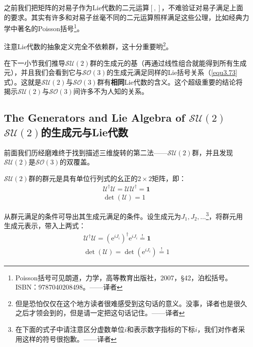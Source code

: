 之前我们把矩阵的对易子作为Lie代数的二元运算$[,]$，不难验证对易子满足上面的要求。其实有许多和对易子丝毫不同的二元运算照样满足这些公理，比如经典力学中著名的Poisson括号\footnote{Poisson括号可见朗道，力学，高等教育出版社，2007，\S42，泊松括号。ISBN：9787040208498。——译者}。

注意Lie代数的抽象定义完全不依赖群，这十分重要哟\footnote{但是恐怕仅仅在这个地方读者很难感受到这句话的意义。没事，译者也是很久之后才领会到的，但是请一定把这句话记住。——译者}。

在下一小节我们推导$\mathcal{SU}(2)$群的生成元的基（再通过线性组合就能得到所有生成元），并且我们会看到它与$\mathcal{SO}(3)$的生成元满足同样的Lie括号关系（\eqref{equ3.73}式）。这就是$\mathcal{SU}(2)$与$\mathcal{SO}(3)$群有{\bfseries 相同}Lie代数的含义。这个超级重要的结论将揭示$\mathcal{SU}(2)$与$\mathcal{SO}(3)$间许多不为人知的关系。



\subsection[$\mathcal{SU}(2)$的生成元与Lie代数]{The Generators and Lie Algebra of $\mathcal{SU}(2)$ \quad $\mathcal{SU}(2)$的生成元与Lie代数}
\label{sec3.4.3}
前面我们历经磨难终于找到描述三维旋转的第二法——$\mathcal{SU}(2)$群，并且发现$\mathcal{SU}(2)$是$\mathcal{SO}(3)$的双覆盖。

$\mathcal{SU}(2)$群的群元是具有单位行列式的幺正的$2 \times 2$矩阵，即：
\begin{align}
\label{equ3.75}
\mathcal{U}^\dag \mathcal{U} = \mathcal{U} \mathcal{U}^\dag = \mathbf{1} \\
\label{equ3.76}
\det (\mathcal{U}) = 1
\end{align}

从群元满足的条件可导出其生成元满足的条件。设生成元为$J_1, J_2, \dots$\footnote{在下面的式子中请注意区分虚数单位$i$和表示数字指标的下标$i$，我们对作者采用这样的符号很抱歉。——译者}，将群元用生成元表示，带入上两式：
\begin{align}
\label{equ3.77}
\mathcal{U}^\dag \mathcal{U} = (\mathrm{e}^{iJ_i})^\dag \mathrm{e}^{iJ_i} \stackrel{!}{=} \mathbf{1} \\
\label{equ3.78}
\det (\mathcal{U}) = \det (\mathrm{e}^{iJ_i}) \stackrel{!}{=} 1
\end{align}

